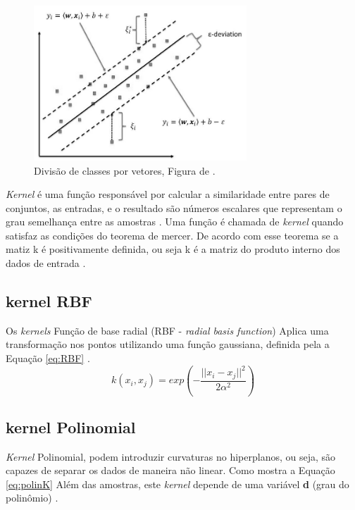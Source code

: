 \begin{figure}[h]
    \centering
    \includegraphics[width=8cm]{figuras/SVM/SVM_1.png}
    \caption{Divisão de classes por vetores, Figura de \cite{BattaMahesh2018}.}
    \label{fig:SVM_1}
\end{figure}

\textit{Kernel} é uma função responsável por calcular a similaridade entre pares de conjuntos, as entradas, e o resultado são números
escalares que representam o grau semelhança entre as amostras \cite{noronha2016implementaccao}. Uma função é chamada de \textit{kernel} quando satisfaz as condições do teorema de mercer. 
De acordo com esse teorema se a matiz k é positivamente definida, ou seja k é a matriz do produto interno dos dados de entrada \cite{falcao2017aplicaccao}.

\subsection{kernel RBF}
Os \textit{kernels} Função de base radial (RBF - \textit{radial basis function}) Aplica uma transformação nos pontos utilizando uma função gaussiana, definida 
pela a Equação \ref{eq:RBF} \cite{Almeida_Carvalho_Menino_2020}.
\begin{equation}
  k( x_{i},  x_{j}) = exp\left (-\frac{||x_{i} - x_{j}||^2}{2\alpha^2}  \right )
  \label{eq:RBF}
\end{equation}

\subsection{kernel Polinomial}

\textit{Kernel} Polinomial, podem introduzir curvaturas no hiperplanos, ou seja, são capazes de separar os dados
de maneira não linear. Como mostra a Equação \ref{eq:polinK} Além das amostras, este \textit{kernel} depende de uma variável \textbf{d} (grau do 
polinômio) \cite{noronha2016implementaccao}. 

